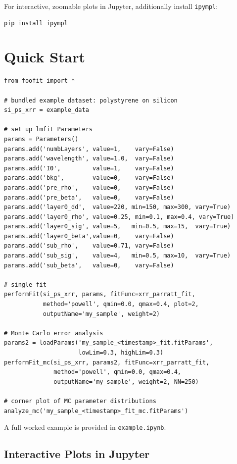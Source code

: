 \documentclass[11pt,a4paper]{article}
\begin{document}
For interactive, zoomable plots in Jupyter, additionally install \texttt{ipympl}:
\begin{verbatim}
pip install ipympl
\end{verbatim}

\section{Quick Start}

\begin{verbatim}
from foofit import *

# bundled example dataset: polystyrene on silicon
si_ps_xrr = example_data

# set up lmfit Parameters
params = Parameters()
params.add('numbLayers', value=1,    vary=False)
params.add('wavelength', value=1.0,  vary=False)
params.add('I0',         value=1,    vary=False)
params.add('bkg',        value=0,    vary=False)
params.add('pre_rho',    value=0,    vary=False)
params.add('pre_beta',   value=0,    vary=False)
params.add('layer0_dd',  value=220, min=150, max=300, vary=True)
params.add('layer0_rho', value=0.25, min=0.1, max=0.4, vary=True)
params.add('layer0_sig', value=5,   min=0.5, max=15,  vary=True)
params.add('layer0_beta',value=0,    vary=False)
params.add('sub_rho',    value=0.71, vary=False)
params.add('sub_sig',    value=4,   min=0.5, max=10,  vary=True)
params.add('sub_beta',   value=0,    vary=False)

# single fit
performFit(si_ps_xrr, params, fitFunc=xrr_parratt_fit,
           method='powell', qmin=0.0, qmax=0.4, plot=2,
           outputName='my_sample', weight=2)

# Monte Carlo error analysis
params2 = loadParams('my_sample_<timestamp>_fit.fitParams',
                     lowLim=0.3, highLim=0.3)
performFit_mc(si_ps_xrr, params2, fitFunc=xrr_parratt_fit,
              method='powell', qmin=0.0, qmax=0.4,
              outputName='my_sample', weight=2, NN=250)

# corner plot of MC parameter distributions
analyze_mc('my_sample_<timestamp>_fit_mc.fitParams')
\end{verbatim}

A full worked example is provided in \texttt{example.ipynb}.

\subsection*{Interactive Plots in Jupyter}
\end{document}
